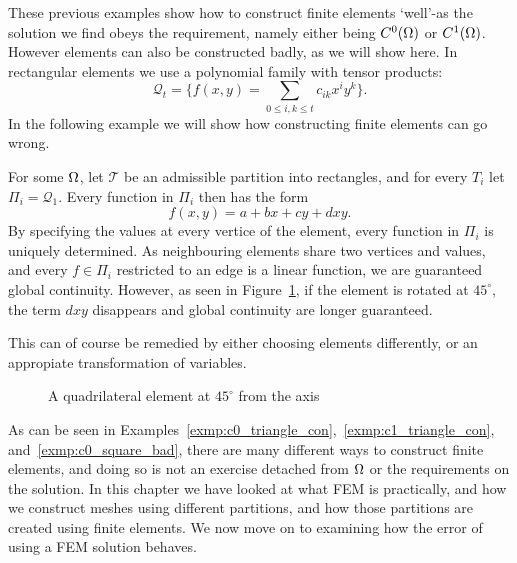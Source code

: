 These previous examples show how to construct finite elements `well'-as 
the solution we find obeys the requirement, namely either being $C^0(\Omega)$ or 
$C^1(\Omega)$. However elements can also be constructed badly, as we will 
show here. In rectangular elements we use a polynomial family with 
tensor products:
\begin{equation*}
    \mathcal{Q}_t = \{ f(x,y)= \sum_{0\leq i,k \leq t} c_{ik}x^i y^k \}.
\end{equation*}
In the following example we will show how constructing finite elements 
can go wrong.
\begin{exmp}{\quad\label{exmp:c0_square_bad}}
   For some $\Omega$, let $\mathcal{T}$ be an admissible partition into 
   rectangles, and for every $T_i$ let $\Pi_i = \mathcal{Q}_1$. 
   Every function in $\Pi_i$ then has the form 
   \begin{equation*}
    f(x,y) = a + bx + cy + dxy.
   \end{equation*}
   By specifying the values at every vertice of the element, every 
   function in $\Pi_i$ is uniquely determined. 
   As neighbouring elements share two vertices and values, and every $f\in\Pi_i$
   restricted to an edge is a linear function, we are guaranteed global 
   continuity. However, 
    as seen in Figure~\ref{fig:quad_element_bad}, if the element is rotated 
   at $45^\circ$, the term $dxy$ disappears and global continuity are longer 
   guaranteed.

   This can of course be remedied by either choosing elements differently, 
   or an appropiate transformation of variables.
\end{exmp}
\begin{figure}[ht]
    \centering
    
    \caption{A quadrilateral element at $45^\circ$ from the axis}\label{fig:quad_element_bad}
\end{figure}
As can be seen in Examples~\ref{exmp:c0_triangle_con},~\ref{exmp:c1_triangle_con}, 
and~\ref{exmp:c0_square_bad}, there are many different ways to construct 
finite elements, and doing so is not an exercise detached from $\Omega$ or 
the requirements on the solution. In this chapter we have looked at what FEM is practically, and how we construct 
meshes using different partitions, and how those partitions are created using 
finite elements. We now move on to examining how the error of using a 
FEM solution behaves.